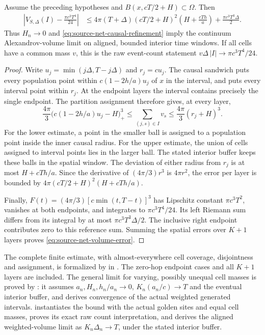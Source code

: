\begin{proposition}
\label{prop:source-net-alexandrov-volume}
Assume the preceding hypotheses and
$B(x,cT/2+H)\subset\Omega$. Then
\begin{align}
 \left|V_{S,\Delta}(I)-\frac{\pi c^3T^4}{24}\right|
 &\leq 4\pi(T+\Delta)(cT/2+H)^2
       \left(H+\frac{cTh}{a}\right)
       +\frac{\pi c^3T^3\Delta}{2}.
 \label{eq:source-net-volume-error}
\end{align}
Thus $H_n\to0$ and \eqref{eq:source-net-causal-refinement} imply the
continuum Alexandrov-volume limit on aligned, bounded interior time
windows. If all cells have a common mass $v$, this is the raw event-count
statement $v\Delta\,|I|\to\pi c^3T^4/24$.
\end{proposition}
\begin{proof}
Write $u_j=\min(j\Delta,T-j\Delta)$ and $r_j=cu_j$. The causal sandwich
puts every population point within $c(1-2h/a)u_j$ of $x$ in the interval,
and puts every interval point within $r_j$. At the endpoint layers the
interval contains precisely the single endpoint. The partition assignment
therefore gives, at every layer,
\[
 \frac{4\pi}{3}\bigl(c(1-2h/a)u_j-H\bigr)_+^3
 \leq\sum_{(j,s)\in I}v_s
 \leq\frac{4\pi}{3}(r_j+H)^3.
\]
For the lower estimate, a point in the smaller ball is assigned to a
population point inside the inner causal radius. For the upper estimate,
the union of cells assigned to interval points lies in the larger ball.
The stated interior buffer keeps these balls in the spatial window.
The deviation of either radius from $r_j$ is at most
$H+cTh/a$. Since the derivative of $(4\pi/3)r^3$ is $4\pi r^2$, the
error per layer is bounded by
$4\pi(cT/2+H)^2(H+cTh/a)$.

Finally, $F(t)=(4\pi/3)[c\min(t,T-t)]^3$ has Lipschitz constant
$\pi c^3T^2$, vanishes at both endpoints, and integrates to
$\pi c^3T^4/24$. Its left Riemann sum differs from its integral by at most
$\pi c^3T^3\Delta/2$. The inclusive right endpoint contributes zero to
this reference sum. Summing the spatial errors over $K+1$ layers proves
\eqref{eq:source-net-volume-error}.
\end{proof}

The complete finite estimate, with almost-everywhere cell coverage,
disjointness and assignment, is formalized by
 in
.
The zero-hop endpoint cases and all $K+1$ layers are included.
The general limit for varying, possibly unequal cell masses is proved by
: it assumes
$a_n,H_n,h_n/a_n\to0$, $K_n(a_n/c)\to T$ and the eventual interior buffer,
and derives convergence of the actual weighted generated intervals.
 instantiates the bound
with the actual golden sites and equal cell masses, proves its exact raw
count interpretation, and derives the aligned weighted-volume limit as
$K_n\Delta_n\to T$, under the stated interior buffer.

